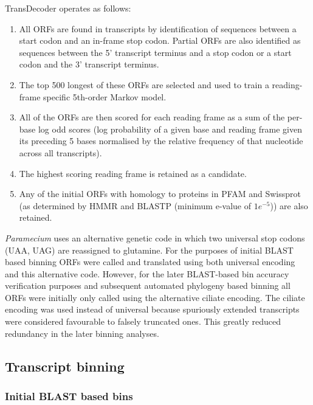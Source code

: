 TransDecoder operates as follows:
\begin{enumerate}
    \item All ORFs are found in transcripts by identification of sequences
        between a start codon and an in-frame stop codon. Partial ORFs are also
        identified as sequences between the 5' transcript terminus and a stop codon
        or a start codon and the 3' transcript terminus.
    \item The top 500 longest of these ORFs are selected and used to train a 
        reading-frame specific 5th-order Markov model.
    \item All of the ORFs are then scored for each reading frame
        as a sum of the per-base log odd scores
        (log probability of a given base and reading frame given its preceding
        5 bases normalised by the relative frequency of that nucleotide
        across all transcripts).
    \item The highest scoring reading frame is retained as a candidate.
        
     \item Any of the initial ORFs with homology to proteins in PFAM and Swissprot (as determined by HMMR
        and BLASTP (minimum e-value of \(1e^{-5}\))) are also retained.
\end{enumerate}




\textit{Paramecium} uses an alternative
genetic code in which two universal stop codons (UAA, UAG) are reassigned to glutamine.
For the purposes of initial BLAST based binning ORFs were called and translated
using both universal encoding and this alternative code. However, for 
the later BLAST-based bin accuracy verification purposes and subsequent
automated phylogeny based binning all ORFs were initially only called using 
the alternative ciliate encoding. The ciliate encoding was used
instead of universal because spuriously extended transcripts
were considered favourable to falsely truncated ones.
This greatly reduced redundancy in the later binning analyses.

\subsection{Transcript binning}

\subsubsection{Initial BLAST based bins}

